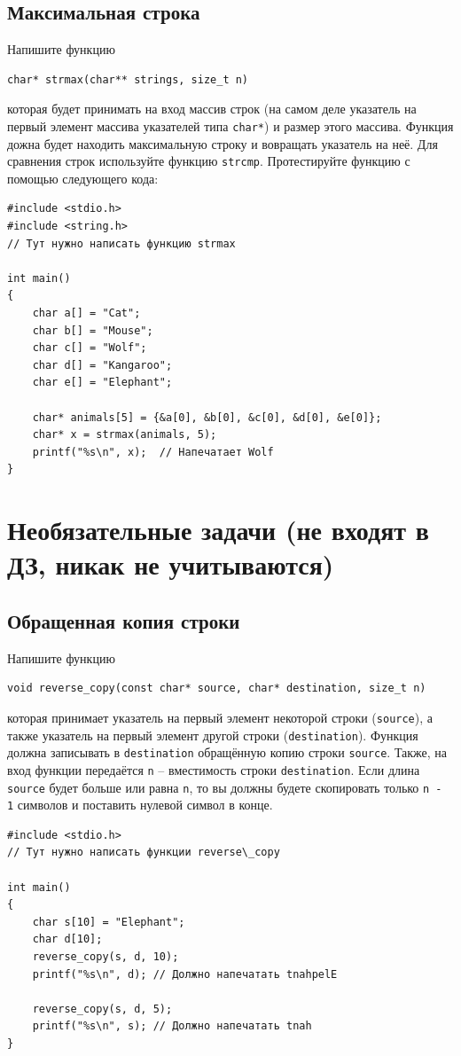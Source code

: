 \documentclass[10pt]{article}
\begin{document}
 
\subsection{Максимальная строка}
Напишите функцию
\begin{lstlisting}
char* strmax(char** strings, size_t n)
\end{lstlisting}
которая будет принимать на вход массив строк (на самом деле указатель на первый элемент массива указателей типа \texttt{char*}) и размер этого массива.
Функция дожна будет находить максимальную строку и вовращать указатель на неё.
Для сравнения строк используйте функцию \texttt{strcmp}.
Протестируйте функцию с помощью следующего кода:
\begin{lstlisting}
#include <stdio.h>
#include <string.h>
// Тут нужно написать функцию strmax

int main() 
{
    char a[] = "Cat";
    char b[] = "Mouse";
    char c[] = "Wolf";
    char d[] = "Kangaroo";
    char e[] = "Elephant";
    
    char* animals[5] = {&a[0], &b[0], &c[0], &d[0], &e[0]};
    char* x = strmax(animals, 5);
    printf("%s\n", x);  // Напечатает Wolf
}
\end{lstlisting} 



\newpage
\section*{Необязательные задачи (не входят в ДЗ, никак не учитываются)}
\setcounter{subsection}{0}

\subsection{Обращенная копия строки}
Напишите функцию 
\begin{lstlisting}
void reverse_copy(const char* source, char* destination, size_t n)
\end{lstlisting}
которая принимает указатель на первый элемент некоторой строки (\texttt{source}), а также указатель на первый элемент другой строки (\texttt{destination}). Функция должна записывать в \texttt{destination} обращённую копию строки \texttt{source}. Также, на вход функции передаётся \texttt{n} -- вместимость строки \texttt{destination}. Если длина \texttt{source} будет больше или равна \texttt{n}, то вы должны будете скопировать только \texttt{n - 1} символов и поставить нулевой символ в конце.

\begin{lstlisting}
#include <stdio.h>
// Тут нужно написать функции reverse\_copy

int main() 
{
    char s[10] = "Elephant";
    char d[10];
    reverse_copy(s, d, 10);
    printf("%s\n", d); // Должно напечатать tnahpelE
    
    reverse_copy(s, d, 5);
    printf("%s\n", s); // Должно напечатать tnah
}
\end{lstlisting}
\end{document}
